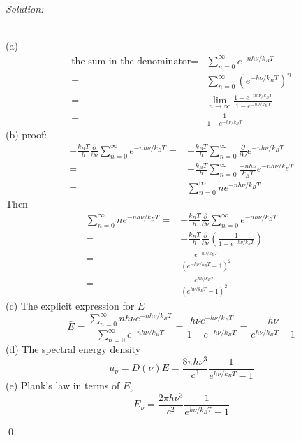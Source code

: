 \documentclass[12pt]{article}
\newenvironment{sol}
    {\emph{Solution:}
    }
    {
    \qed
    }
\begin{document}
\begin{sol}
\\(a)
\begin{align}
\nonumber\text{the sum in the denominator}=&\sum_{n=0}^{\infty}e^{-nh\nu/k_BT}\\
\nonumber=&\sum_{n=0}^{\infty}(e^{-h\nu/k_BT})^n\\
\nonumber=&\lim_{n\rightarrow\infty}\frac{1-e^{-nh\nu/k_BT}}{1-e^{-h\nu/k_BT}}\\
=&\frac{1}{1-e^{-h\nu/k_BT}}
\end{align}
(b) proof:
\begin{align}
\nonumber-\frac{k_BT}{h}\frac{\partial}{\partial\nu}\sum_{n=0}^{\infty}e^{-nh\nu/k_BT}=&-\frac{k_BT}{h}\sum_{n=0}^{\infty}\frac{\partial}{\partial\nu}e^{-nh\nu/k_BT}\\
\nonumber=&-\frac{k_BT}{h}\sum_{n=0}^{\infty}\frac{-nh\nu}{k_BT}e^{-nh\nu/k_BT}\\
=&\sum_{n=0}^{\infty}ne^{-nh\nu/k_BT}
\end{align}
Then
\begin{align}
\nonumber\sum_{n=0}^{\infty}ne^{-nh\nu/k_BT}=&-\frac{k_BT}{h}\frac{\partial}{\partial\nu}\sum_{n=0}^{\infty}e^{-nh\nu/k_BT}\\
\nonumber=&-\frac{k_BT}{h}\frac{\partial}{\partial\nu}(\frac{1}{1-e^{-h\nu/k_BT}})\\
\nonumber=&\frac{e^{-h\nu/k_BT}}{(e^{-h\nu/k_BT}-1)^2}\\
=&\frac{e^{h\nu/k_BT}}{(e^{h\nu/k_BT}-1)^2}
\end{align}
(c) The explicit expression for $\bar{E}$
\begin{equation}
\bar{E}=\frac{\sum_{n=0}^{\infty}nh\nu e^{-nh\nu/k_BT}}{\sum_{n=0}^{\infty}e^{-nh\nu/k_BT}}=\frac{h\nu e^{-h\nu/k_BT}}{1-e^{-h\nu/k_BT}}=\frac{h\nu}{e^{h\nu/k_BT}-1}
\end{equation}
(d) The spectral energy density
\begin{equation}
u_{\nu}=D(\nu)\bar{E}=\frac{8\pi h\nu^3}{c^3}\frac{1}{e^{h\nu/k_BT}-1}
\end{equation}
(e) Plank's law in terms of $E_{\nu}$
\begin{equation}
E_{\nu}=\frac{2\pi h\nu^3}{c^2}\frac{1}{e^{h\nu/k_BT}-1}
\end{equation}
\end{sol}
\end{document}
